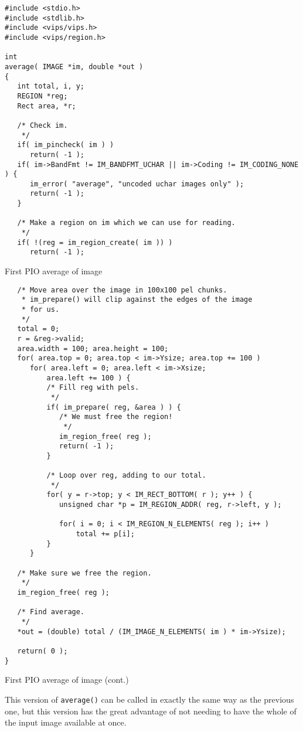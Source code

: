\begin{fig2}
\begin{verbatim}
#include <stdio.h>
#include <stdlib.h>
#include <vips/vips.h>
#include <vips/region.h>

int
average( IMAGE *im, double *out )
{
   int total, i, y;
   REGION *reg;
   Rect area, *r;

   /* Check im.
    */
   if( im_pincheck( im ) )
      return( -1 );
   if( im->BandFmt != IM_BANDFMT_UCHAR || im->Coding != IM_CODING_NONE ) {
      im_error( "average", "uncoded uchar images only" );
      return( -1 );
   }

   /* Make a region on im which we can use for reading.
    */
   if( !(reg = im_region_create( im )) )
      return( -1 );
\end{verbatim}
\caption{First PIO average of image}
\label{fg:paverage}
\end{fig2}

\begin{fig2}
\begin{verbatim}
   /* Move area over the image in 100x100 pel chunks. 
    * im_prepare() will clip against the edges of the image 
    * for us.
    */
   total = 0;
   r = &reg->valid;     
   area.width = 100; area.height = 100;
   for( area.top = 0; area.top < im->Ysize; area.top += 100 )
      for( area.left = 0; area.left < im->Xsize; 
          area.left += 100 ) {
          /* Fill reg with pels.
           */
          if( im_prepare( reg, &area ) ) {
             /* We must free the region!
              */
             im_region_free( reg );
             return( -1 );
          }

          /* Loop over reg, adding to our total.
           */
          for( y = r->top; y < IM_RECT_BOTTOM( r ); y++ ) {
             unsigned char *p = IM_REGION_ADDR( reg, r->left, y );

             for( i = 0; i < IM_REGION_N_ELEMENTS( reg ); i++ )
                 total += p[i];
          }
      }

   /* Make sure we free the region.
    */
   im_region_free( reg );

   /* Find average.
    */
   *out = (double) total / (IM_IMAGE_N_ELEMENTS( im ) * im->Ysize);

   return( 0 );
}    
\end{verbatim}
\caption{First PIO average of image (cont.)}
\end{fig2}

This version of \verb+average()+ can be called in exactly the same way as
the previous one, but this version has the great advantage of not needing
to have the whole of the input image available at once.

